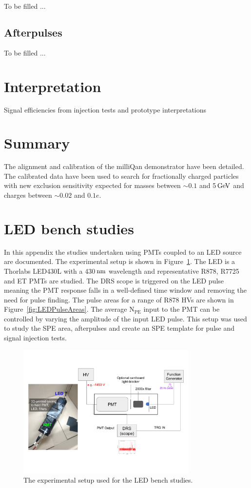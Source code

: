 \documentclass[12pt]{article}
\newcommand{\unit}[1]{\ensuremath{\text{\,#1}}\xspace}
\newcommand{\npe} {\mbox{\ensuremath{\textrm{N}_\textrm{PE}}}\xspace}
\begin{document}
To be filled ...

\subsection{Afterpulses}

To be filled ...

\section{Interpretation}

Signal efficiencies from injection tests and prototype interpretations
\section{Summary}

The alignment and calibration of the milliQan demonstrator have been detailed. The calibrated
data have been used to search for fractionally charged particles with new 
exclusion sensitivity expected for masses between $\sim0.1$ and 5\unit{GeV} 
and charges between $\sim0.02$ and $0.1e$.

\appendix
\section{LED bench studies}
\label{app:speLEDCalib}
In this appendix the studies undertaken using PMTs coupled to an LED source are documented.
The experimental setup is shown in Figure~\ref{fig:LEDSetup}. The LED is a Thorlabs LED430L with a 430\unit{nm} wavelength 
and representative R878, R7725 and ET PMTs are studied. The DRS scope is triggered on
the LED pulse meaning the PMT response falls in a well-defined time window 
and removing the need for pulse finding. The pulse areas for a range of R878 HVs are
shown in Figure~\ref{fig:LEDPulseAreas}. The average \npe input to the PMT can be controlled by varying the amplitude of the input LED pulse.
This setup was used to study the SPE area, afterpulses and create an SPE template for 
pulse and signal injection tests. 

\begin{figure}[ht!]
    \centering
    \includegraphics[width=0.8\textwidth]{figures/LEDsetup}
    \caption{\label{fig:LEDSetup} The experimental setup used for the LED bench studies. }
\end{figure}
\end{document}
